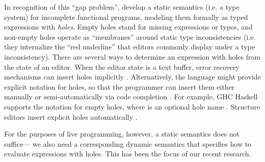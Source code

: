 In recognition of this ``{gap problem}'', \citet{popl-paper} develop a static semantics (i.e. a type system) for incomplete 
functional programs, modeling them formally as typed expressions with \emph{holes}. 
Empty holes stand for missing expressions or types,
and non-empty holes operate as ``membranes'' around static type inconsistencies 
(i.e. they internalize the ``red underline'' that editors commonly display under a type inconsistency).
There are several ways to determine an expression with holes from the state of an editor. When the editor state is a text buffer, error recovery mechanisms can insert holes implicitly \cite{DBLP:journals/siamcomp/AhoP72,charles1991practical,DBLP:conf/oopsla/KatsJNV09}. 
Alternatively, the language might provide explicit notation for holes, so that the programmer can insert them either manually  
or semi-automatically via code completion \cite{Amorim2016}. For example, GHC Haskell supports the notation  for empty holes, where  is an optional hole name \cite{GHCHoles}. Structure editors insert explicit holes automatically \cite{popl-paper}.

%
For the purposes of live programming, however, a static semantics does not suffice---%
we also need a corresponding dynamic semantics that specifies how to evaluate expressions with holes. This has been the focus of our recent research. %
%

